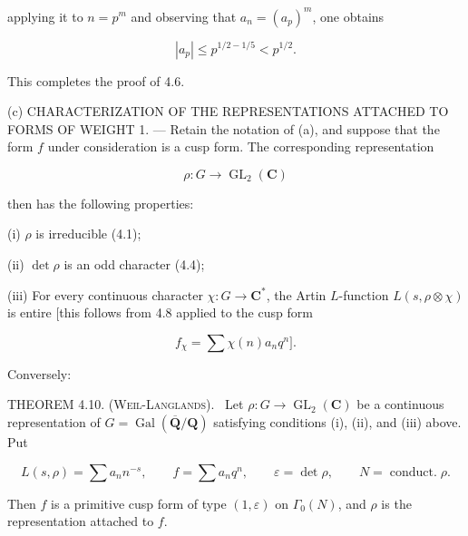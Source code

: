 \documentclass[10pt,oneside]{article}
\begin{document}
applying it to \(n=p^m\) and observing that \(a_n=(a_p)^m\), one obtains\par

\begin{equation*}
|a_p|\leq p^{1/2-1/5}<p^{1/2}.
\end{equation*}

This completes the proof of 4.6.\par

(c) CHARACTERIZATION OF THE REPRESENTATIONS ATTACHED TO FORMS OF WEIGHT 1. — Retain the notation of (a), and suppose that the form \(f\) under consideration is a cusp form. The corresponding representation\par

\begin{equation*}
\rho:G\longrightarrow\operatorname{GL}_2(\mathbf{C})
\end{equation*}

then has the following properties:\par

(i) \(\rho\) is irreducible (4.1);\par

(ii) \(\det\rho\) is an odd character (4.4);\par

(iii) For every continuous character \(\chi:G\longrightarrow\mathbf{C}^*\), the Artin \(L\)-function \(L(s,\rho\otimes\chi)\) is entire [this follows from 4.8 applied to the cusp form\par

\begin{equation*}
f_\chi=\sum\chi(n)a_nq^n].
\end{equation*}

Conversely:\par

\noindent\textsc{THEOREM 4.10. (Weil-Langlands).} \textemdash\ Let \(\rho:G\longrightarrow\operatorname{GL}_2(\mathbf{C})\) be a continuous representation of \(G=\operatorname{Gal}(\overline{\mathbf{Q}}/\mathbf{Q})\) satisfying conditions (i), (ii), and (iii) above. Put\par

\begin{equation*}
L(s,\rho)=\sum a_nn^{-s},
\qquad f=\sum a_nq^n,
\qquad\varepsilon=\det\rho,
\qquad N=\operatorname{conduct.}\rho.
\end{equation*}

Then \(f\) is a primitive cusp form of type \((1,\varepsilon)\) on \(\Gamma_0(N)\), and \(\rho\) is the representation attached to \(f\).\par
\end{document}
